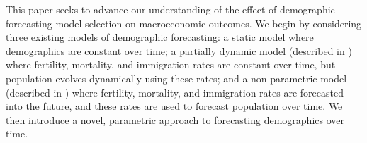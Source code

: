 \documentclass[10pt]{article}
\renewcommand{\thesection}{\arabic{section}}
\renewcommand{\section}[2][]{\oldsection[#1]{#2}\index{#1}\label{sec:\thesection}}
\numberwithin{equation}{subsection}
\begin{document}













\section{Conclusion}

\par This paper seeks to advance our understanding of the effect of demographic forecasting model selection on macroeconomic outcomes. We begin by considering three existing models of demographic forecasting: a static model where demographics are constant over time; a partially dynamic model (described in \cite{DE2018}) where fertility, mortality, and immigration rates are constant over time, but population evolves dynamically using these rates; and a non-parametric model (described in \cite{alt_demo_paper}) where fertility, mortality, and immigration rates are forecasted into the future, and these rates are used to forecast population over time. We then introduce a novel, parametric approach to forecasting demographics over time.
\end{document}
